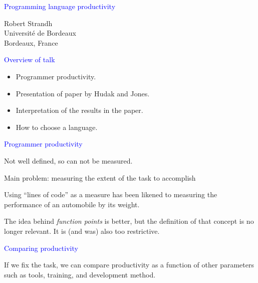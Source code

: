 \documentclass{slides}
\newcommand{\ti}[1]{\begin{center}\Large{\textcolor{blue}{#1}}\end{center}}
\begin{document}
\landscape
\setlength{\oddsidemargin}{1cm}
\setlength{\evensidemargin}{1cm}
\setlength{\marginparwidth}{1cm}
\setlength{\parskip}{0.5cm}
\setlength{\parindent}{0cm}
\begin{slide}\ti{Programming language productivity}
\vskip 0.5cm
\begin{center}
Robert Strandh \\
Université de Bordeaux \\
Bordeaux, France
\end{center}
\vfill\end{slide}
\begin{slide}\ti{Overview of talk}

  \begin{itemize}
  \item Programmer productivity.
  \item Presentation of paper by Hudak and Jones.
  \item Interpretation of the results in the paper.
  \item How to choose a language.
  \end{itemize}

\vfill\end{slide}
\begin{slide}\ti{Programmer productivity}

Not well defined, so can not be measured.

Main problem: measuring the extent of the task to accomplish

Using ``lines of code'' as a measure has been likened to measuring the
performance of an automobile by its weight.

The idea behind \emph{function points} is better, but the definition
of that concept is no longer relevant.  It is (and was) also too
restrictive.

\vfill\end{slide}
\begin{slide}\ti{Comparing productivity}

If we fix the task, we can compare productivity as a function of other
parameters such as tools, training, and development method.

\vfill\end{slide}
\end{document}
